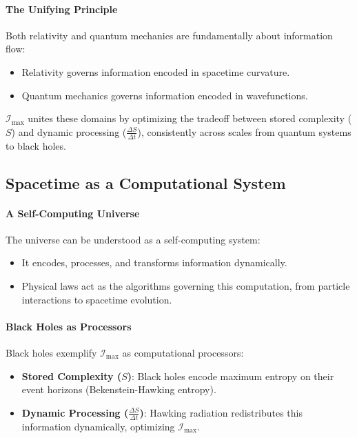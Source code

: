 \documentclass[12pt]{article}
\begin{document}
\paragraph{The Unifying Principle}
Both relativity and quantum mechanics are fundamentally about information flow:
\begin{itemize}
    \item Relativity governs information encoded in spacetime curvature.
    \item Quantum mechanics governs information encoded in wavefunctions.
\end{itemize}
\(\mathcal{I}_{\text{max}}\) unites these domains by optimizing the tradeoff between stored complexity (\(S\)) and dynamic processing (\(\frac{\Delta S}{\Delta t}\)), consistently across scales from quantum systems to black holes.

\subsection{Spacetime as a Computational System}

\paragraph{A Self-Computing Universe}
The universe can be understood as a self-computing system:
\begin{itemize}
    \item It encodes, processes, and transforms information dynamically.
    \item Physical laws act as the algorithms governing this computation, from particle interactions to spacetime evolution.
\end{itemize}

\paragraph{Black Holes as Processors}
Black holes exemplify \(\mathcal{I}_{\text{max}}\) as computational processors:
\begin{itemize}
    \item \textbf{Stored Complexity (\(S\))}: Black holes encode maximum entropy on their event horizons (Bekenstein-Hawking entropy).
    \item \textbf{Dynamic Processing (\(\frac{\Delta S}{\Delta t}\))}: Hawking radiation redistributes this information dynamically, optimizing \(\mathcal{I}_{\text{max}}\).
\end{itemize}
\end{document}
